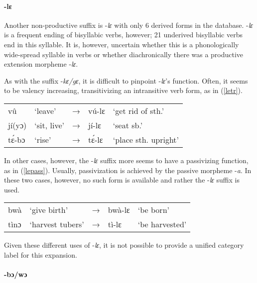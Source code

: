 \paragraph{{\bfseries -lɛ}}

Another non-productive suffix is -{\itshape lɛ} with only 6 derived forms in the database. -{\itshape lɛ} is a frequent ending of bisyllabic verbs, however; 21 underived bisyllabic verbs end in this syllable. It is, however, uncertain whether this is a phonologically wide-spread syllable in verbs or whether diachronically there was a productive extension morpheme -{\itshape lɛ}.

As with the suffix -{\itshape kɛ/gɛ}, it is difficult to pinpoint -{\itshape lɛ}'s function. Often, it seems to be valency increasing, transitivizing an intransitive verb form, as in (\ref{letr}).


\begin{exe} \ex \label{letr}
\begin{tabular}{llllp{4cm}}
vû & `leave' & → & vú-lɛ & `get rid of sth.' \\
jí(yɔ) & `sit, live' & → & jí-lɛ & `seat sb.' \\
tɛ́-bɔ & `rise' & → & tɛ́-lɛ & `place sth. upright' \\
\end{tabular}
\end{exe}

In other cases, however, the -{\itshape lɛ} suffix more seems to have a passivizing function, as in (\ref{lepass}). Usually, passivization is achieved by the passive morpheme -{\itshape a}. In these two cases, however, no such form is available and rather the -{\itshape lɛ} suffix is used.


\begin{exe} \ex \label{lepass}
\begin{tabular}{llllp{4cm}}
bwà & `give birth' & → & bwà-lɛ & `be born' \\
tìnɔ & `harvest tubers' & → & tì-lɛ & `be harvested' \\
\end{tabular}
\end{exe}

Given these different uses of -{\itshape lɛ}, it is not possible to provide a unified category label for this expansion.


\paragraph{{\bfseries -bɔ/wɔ}}

